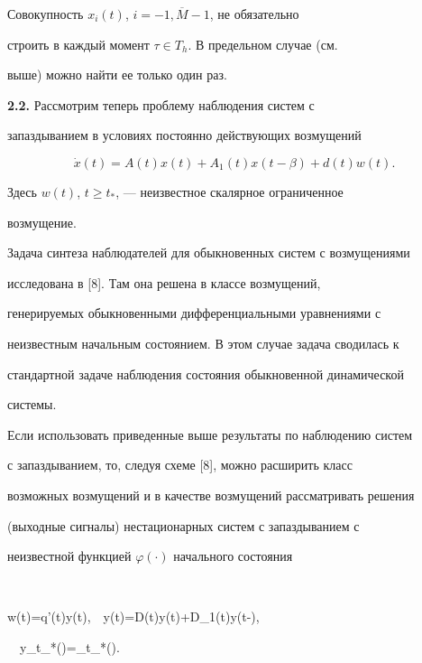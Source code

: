 \begin{notes}


Совокупность $x_{i}(t)$, $i=\overline{-1, M-1}$, не обязательно


строить в каждый момент $\tau \in T_{h}$. В предельном случае (см.


выше) можно найти ее только один раз.


\end{notes}





{\bf 2.2.} Рассмотрим теперь проблему наблюдения систем с


запаздыванием в условиях постоянно действующих возмущений


$$


\Dot x(t)=A(t)x(t)+A_{1}(t)x(t-\beta)+d(t)w(t).


$$


Здесь $w(t)$, $t \ge t_{*}$, --- неизвестное скалярное ограниченное


возмущение.





Задача синтеза наблюдателей для обыкновенных систем с возмущениями


исследована в [8]. Там она решена в классе возмущений,


генерируемых обыкновенными дифференциальными уравнениями с


неизвестным начальным состоянием. В этом случае задача сводилась к


стандартной задаче наблюдения состояния обыкновенной динамической


системы.





Если использовать приведенные выше результаты по наблюдению систем


с запаздыванием, то, следуя схеме [8], можно расширить класс


возможных возмущений и в качестве возмущений рассматривать решения


(выходные сигналы) нестационарных систем с запаздыванием с


неизвестной функцией $\varphi(\cdot)$ начального состояния


$$


w(t)=q'(t)y(t),\ \ \Dot y(t)=D(t)y(t)+D_{1}(t)y(t-\beta),


\ \ y_{t_*}(\cdot)=\psi_{t_*}(\cdot).


